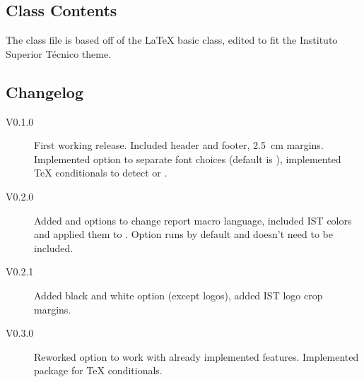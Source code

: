 \subsection{Class Contents}

The class file is based off of the \LaTeX{} basic  class, edited to fit the Instituto Superior Técnico theme.

\subsection{Changelog}

\begin{description}
	\item[V0.1.0] First working release. Included header and footer, \SI{2.5}{\centi\meter} margins. Implemented  option to separate font choices (default is ), implemented \TeX{} conditionals to detect  or .
	\item[V0.2.0] Added  and  options to change report macro language, included IST colors and applied them to . Option  runs by default and doesn't need to be included.
	\item[V0.2.1] Added black and white option (except logos), added IST logo crop margins.
	\item[V0.3.0] Reworked  option to work with already implemented features. Implemented  package for \TeX{} conditionals.
\end{description}
